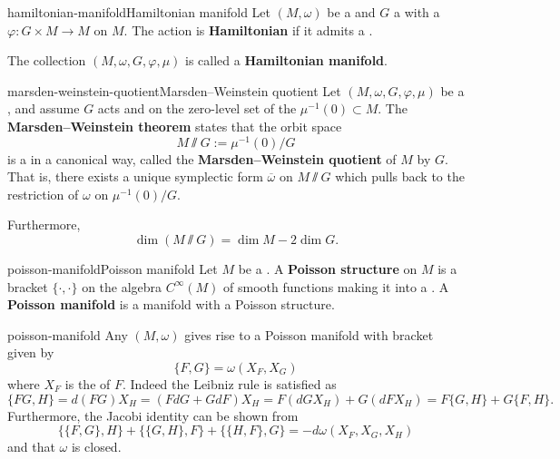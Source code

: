 \begin{topic}{hamiltonian-manifold}{Hamiltonian manifold}
    Let $(M, \omega)$ be a  and $G$ a  with a  $\varphi : G \times M \to M$ on $M$. The action is \textbf{Hamiltonian} if it admits a .
    
    The collection $(M, \omega, G, \varphi, \mu)$ is called a \textbf{Hamiltonian manifold}.
\end{topic}

\begin{topic}{marsden-weinstein-quotient}{Marsden--Weinstein quotient}
    Let $(M, \omega, G, \varphi, \mu)$ be a , and assume $G$ acts  and  on the zero-level set of the  $\mu^{-1}(0) \subset M$. The \textbf{Marsden--Weinstein theorem} states that the orbit space
    \[ M \sslash G := \mu^{-1}(0) / G \]
    is a  in a canonical way, called the \textbf{Marsden--Weinstein quotient} of $M$ by $G$. That is, there exists a unique symplectic form $\overline{\omega}$ on $M \sslash G$ which pulls back to the restriction of $\omega$ on $\mu^{-1}(0) / G$.
    
    Furthermore,
    \[ \dim(M \sslash G) = \dim M - 2 \dim G . \]
\end{topic}

\begin{topic}{poisson-manifold}{Poisson manifold}
    Let $M$ be a . A \textbf{Poisson structure} on $M$ is a bracket $\{ \cdot, \cdot \}$ on the algebra $C^\infty(M)$ of smooth functions making it into a . A \textbf{Poisson manifold} is a manifold with a Poisson structure.
\end{topic}

\begin{example}{poisson-manifold}
    Any  $(M, \omega)$ gives rise to a Poisson manifold with bracket given by
    \[ \{ F, G \} = \omega(X_F, X_G) \]
    where $X_F$ is the  of $F$.
    Indeed the Leibniz rule is satisfied as
    \[ \{ FG, H \} = d(FG) X_H = (F d G + G d F) X_H = F (d G X_H) + G (d F X_H) = F \{ G, H \} + G \{ F, H \} . \]
    Furthermore, the Jacobi identity can be shown from
    \[ \{ \{ F, G \}, H \} + \{ \{ G, H \}, F \} + \{ \{ H, F \}, G \} = -d \omega(X_F, X_G, X_H) \]
    and that $\omega$ is closed.
\end{example}

